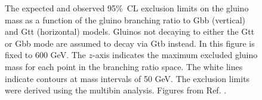 \begin{figure}[htbp]
  \centering 
  \caption{The expected  and observed  95\%~CL exclusion limits on the gluino mass as a function of the gluino branching ratio to Gbb (vertical) and Gtt (horizontal) models. Gluinos not decaying to either the Gtt or Gbb mode are assumed to decay via Gtb instead. In this figure \mchi is fixed to 600 GeV. The $z$-axis indicates the maximum excluded gluino mass for each point in the branching ratio space. The white lines indicate contours at mass intervals of 50 GeV. The exclusion limits were derived using the multibin analysis.
  Figures from Ref. \cite{ATLAS-CONF-2018-041}.
      }
  \label{fig:limits_triangle_600}
\end{figure}

